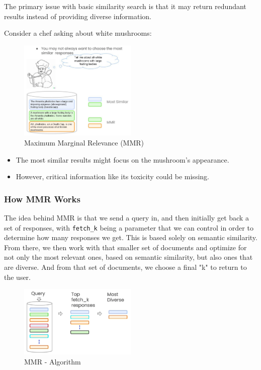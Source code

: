 \documentclass{article}
\begin{document}
The primary issue with basic similarity search is that it may return redundant results instead of providing diverse information.

Consider a chef asking about white mushrooms:

\begin{figure}[H]
    \centering
    \includegraphics[width=0.5\textwidth]{images/langchain_chat_with_your_data_013.png}
    \caption{Maximum Marginal Relevance (MMR)}
    \label{fig:maximum_marginal_relevance_mmr}
\end{figure}

\begin{itemize}
    \item The most similar results might focus on the mushroom’s appearance.
    \item However, critical information like its toxicity could be missing.
\end{itemize}

\subsubsection{How MMR Works}

The idea behind MMR is that we send a query in, and then initially get back a set of responses, with \texttt{fetch\_k} being a parameter that we can control in order to determine how many responses we get. This is based solely on semantic similarity. From there, we then work with that smaller set of documents and optimize for not only the most relevant ones, based on semantic similarity, but also ones that are diverse. And from that set of documents, we choose a final "k" to return to the user.

\begin{figure}[H]
    \centering
    \includegraphics[width=0.5\textwidth]{images/langchain_chat_with_your_data_014.png}
    \caption{MMR - Algorithm}
    \label{fig:mmr_algorithm}
\end{figure}
\end{document}
